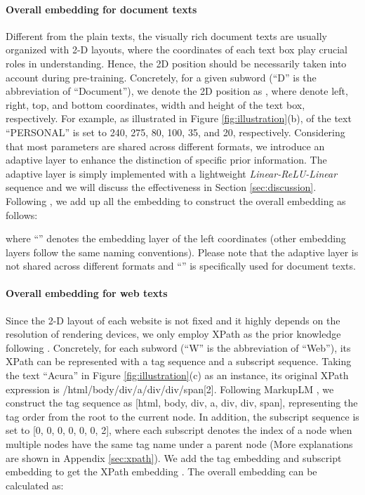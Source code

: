 \documentclass[11pt]{article}
\begin{document}
\paragraph{Overall embedding for document texts} Different from the plain texts, the visually rich document texts are usually organized with 2-D layouts, where the coordinates of each text box play crucial roles in understanding. Hence, the 2D position should be necessarily taken into account during pre-training. Concretely, for a given subword  (``D'' is the abbreviation of ``Document''), we denote the 2D position as , where  denote left, right, top, and bottom coordinates, width and height of the text box, respectively. For example, as illustrated in Figure \ref{fig:illustration}(b),  of the text ``PERSONAL'' is set to 240, 275, 80, 100, 35, and 20, respectively. Considering that most parameters are shared across different formats, we introduce an adaptive layer to enhance the distinction of specific prior information. The adaptive layer is simply implemented with a lightweight \textit{Linear-ReLU-Linear} sequence and we will discuss the effectiveness in Section \ref{sec:discussion}. Following \cite{xu2020layoutlm,xu2020layoutlmv2}, we add up all the embedding to construct the overall embedding  as follows:




where ``'' denotes the embedding layer of the left coordinates (other embedding layers follow the same naming conventions). Please note that the  adaptive layer is not shared across different formats and ``'' is specifically used for document texts.

\paragraph{Overall embedding for web texts} Since the 2-D layout of each website is not fixed and it highly depends on the resolution of rendering devices, we only employ XPath as the prior knowledge following \cite{li2021markuplm}. Concretely, for each subword  (``W'' is the abbreviation of ``Web''), its XPath  can be represented with a tag sequence and a subscript sequence. Taking the text ``Acura'' in Figure \ref{fig:illustration}(c) as an instance, its original XPath expression is /html/body/div/a/div/div/span[2]. Following MarkupLM \cite{li2021markuplm}, we construct the tag sequence as [html, body, div, a, div, div, span], representing the tag order from the root to the current node. In addition, the subscript sequence is set to [0, 0, 0, 0, 0, 0, 2], where each subscript denotes the index of a node when multiple nodes have the same tag name under a parent node (More explanations are shown in Appendix \ref{sec:xpath}). We add the tag embedding and subscript embedding to get the XPath embedding . The overall embedding can be calculated as:
\end{document}
